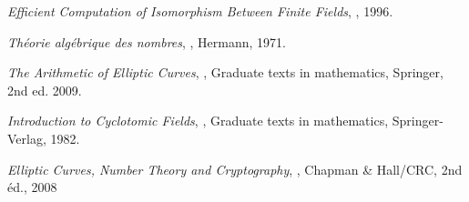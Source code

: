 \documentclass[a4paper]{article} %
\numberwithin{section}{part}
\numberwithin{equation}{section}
\begin{document}
\begin{thebibliography}{LC}
 \emph{Efficient Computation of Isomorphism Between Finite Fields},
, 1996.

 \emph{Théorie algébrique des nombres}, , 
Hermann, 1971.

 \emph{The Arithmetic of Elliptic Curves}, 
, Graduate texts in mathematics, Springer, 2nd ed. 
2009.

 \emph{Introduction to Cyclotomic Fields}, , Graduate texts in mathematics, Springer-Verlag, 1982.

 \emph{Elliptic Curves, Number Theory and Cryptography},
, Chapman \& Hall/CRC, 2nd éd., 2008

\end{thebibliography}
\end{document}
